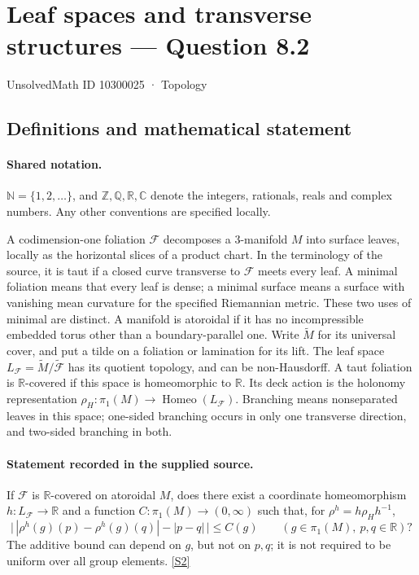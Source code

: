 \documentclass[11pt]{article}
\newcommand{\sref}[2]{\hyperlink{source:#1:#2}{[S#2]}}
\begin{document}
\setcounter{section}{10300024}
\section{Leaf spaces and transverse structures — Question 8.2}\label{10300025}
{\small\sffamily UnsolvedMath ID 10300025 · Topology}
\subsection{Definitions and mathematical statement}

\paragraph{Shared notation.}$\mathbb N=\{1,2,\ldots\}$, and $\mathbb Z,\mathbb Q,\mathbb R,\mathbb C$ denote the integers, rationals, reals and complex numbers. Any other conventions are specified locally.


A codimension-one foliation $\mathcal F$ decomposes a $3$-manifold $M$ into surface leaves, locally as the horizontal slices of a product chart. In the terminology of the source, it is taut if a closed curve transverse to $\mathcal F$ meets every leaf. A minimal foliation means that every leaf is dense; a minimal surface means a surface with vanishing mean curvature for the specified Riemannian metric. These two uses of minimal are distinct. A manifold is atoroidal if it has no incompressible embedded torus other than a boundary-parallel one. Write $\widetilde M$ for its universal cover, and put a tilde on a foliation or lamination for its lift. The leaf space $L_{\mathcal F}=\widetilde M/\widetilde{\mathcal F}$ has its quotient topology, and can be non-Hausdorff. A taut foliation is $\mathbb R$-covered if this space is homeomorphic to $\mathbb R$. Its deck action is the holonomy representation $\rho_H:\pi_1(M)\longrightarrow\operatorname{Homeo}(L_{\mathcal F})$. Branching means nonseparated leaves in this space; one-sided branching occurs in only one transverse direction, and two-sided branching in both.
\paragraph{Statement recorded in the supplied source.}
If $\mathcal F$ is $\mathbb R$-covered on atoroidal $M$, does there exist a coordinate homeomorphism $h:L_{\mathcal F}\to\mathbb R$ and a function $C:\pi_1(M)\to(0,\infty)$ such that, for $\rho^h=h\rho_Hh^{-1}$,
\[\bigl|\,|\rho^h(g)(p)-\rho^h(g)(q)|-|p-q|\,\bigr|\le C(g)\qquad(g\in\pi_1(M),\ p,q\in\mathbb R)?\]
The additive bound can depend on $g$, but not on $p,q$; it is not required to be uniform over all group elements. \sref{10300025}{2}
\end{document}
